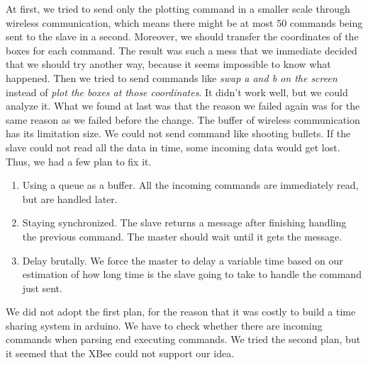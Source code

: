 At first, we tried to send only the plotting command in a smaller scale through wireless communication, which means there might be at most 50 commands being sent to the slave in a second. Moreover, we should transfer the coordinates of the boxes for each command. The result was such a mess that we immediate decided that we should try another way, because it seems impossible to know what happened. Then we tried to send commands like \textit{swap a and b on the screen} instead of \textit{plot the boxes at those coordinates}. It didn't work well, but we could analyze it. What we found at last was that the reason we failed again was for the same reason as we failed before the change. The buffer of wireless communication has its limitation size. We could not send command like shooting bullets. If the slave could not read all the data in time, some incoming data would get lost. Thus, we had a few plan to fix it.
\begin{enumerate}
	\item Using a queue as a buffer. All the incoming commands are immediately read, but are handled later.
	\item Staying synchronized. The slave returns a message after finishing handling the previous command. The master should wait until it gets the message.
	\item Delay brutally. We force the master to delay a variable time based on our estimation of how long time is the slave going to take to handle the command just sent.
\end{enumerate}
\hfill \newline
We did not adopt the first plan, for the reason that it was costly to build a time sharing system in arduino. We have to check whether there are incoming commands when parsing end executing commands. We tried the second plan, but it seemed that the XBee could not support our idea.